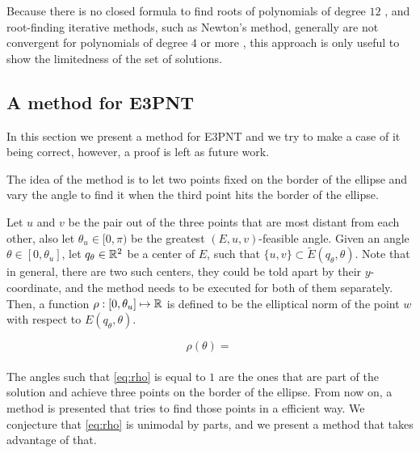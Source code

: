 Because there is no closed formula to find roots of polynomials of degree $12$ \cite{skopenkov2015}, and root-finding iterative methods, such as Newton's method, generally are not convergent for polynomials of degree $4$ or more \cite{mc1}, this approach is only useful to show the limitedness of the set of solutions.

\subsection{A method for E3PNT}

In this section we present a method for E3PNT and we try to make a case of it being correct, however, a proof is left as future work.

The idea of the method is to let two points fixed on the border of the ellipse and vary the angle to find it when the third point hits the border of the ellipse.

Let $u$ and $v$ be the pair out of the three points that are most distant from each other, also let $\theta_u \in [0, \pi)$ be the greatest $(E, u, v)$-feasible angle. Given an angle $\theta \in [0, \theta_u]$, let $q_\theta\in\mathbb{R}^2$ be a center of $E$, such that $\{u, v\} \subset \tilde{E}(q_\theta, \theta)$. Note that in general, there are two such centers, they could be told apart by their $y$-coordinate, and the method needs to be executed for both of them separately.
Then, a function $\rho : [0, \theta_u] \mapsto \mathbb{R}$ is defined to be the elliptical norm of the point $w$ with respect to $E(q_\theta, \theta)$.

\begin{equation}\label{eq:rho}
\rho(\theta) = \dfrac{}{}
\end{equation}

The angles such that \autoref{eq:rho} is equal to $1$ are the ones that are part of the solution and achieve three points on the border of the ellipse. From now on, a method is presented that tries to find those points in a efficient way. We conjecture that \autoref{eq:rho} is unimodal by parts, and we present a method that takes advantage of that.


